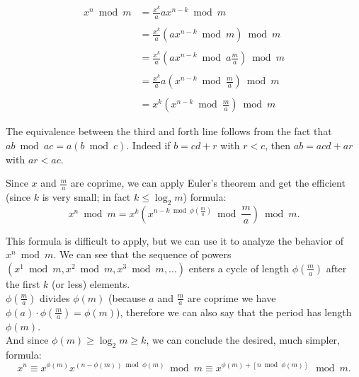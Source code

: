 $$\begin{align}x^n \bmod m &= \frac{x^k}{a}ax^{n-k}\bmod m \\\\
&= \frac{x^k}{a}\left(ax^{n-k}\bmod m\right) \bmod m \\\\
&= \frac{x^k}{a}\left(ax^{n-k}\bmod a \frac{m}{a}\right) \bmod m \\\\
&=\frac{x^k}{a} a \left(x^{n-k} \bmod \frac{m}{a}\right)\bmod m \\\\
&= x^k\left(x^{n-k} \bmod \frac{m}{a}\right)\bmod m
\end{align}$$

The equivalence between the third and forth line follows from the fact that $ab \bmod ac = a(b \bmod c)$.
Indeed if $b = cd + r$ with $r < c$, then $ab = acd + ar$ with $ar < ac$.

Since $x$ and $\frac{m}{a}$ are coprime, we can apply Euler's theorem and get the efficient (since $k$ is very small; in fact $k \le \log_2 m$) formula:
$$x^n \bmod m = x^k\left(x^{n-k \bmod \phi(\frac{m}{a})} \bmod \frac{m}{a}\right)\bmod m.$$

This formula is difficult to apply, but we can use it to analyze the behavior of $x^n \bmod m$. We can see that the sequence of powers $(x^1 \bmod m, x^2 \bmod m, x^3 \bmod m, \dots)$ enters a cycle of length $\phi\left(\frac{m}{a}\right)$ after the first $k$ (or less) elements. \\
$\phi\left(\frac{m}{a}\right)$ divides $\phi(m)$ (because $a$ and $\frac{m}{a}$ are coprime we have $\phi(a) \cdot \phi\left(\frac{m}{a}\right) = \phi(m)$), therefore we can also say that the period has length $\phi(m)$.\\
And since $\phi(m) \ge \log_2 m \ge k$, we can conclude the desired, much simpler, formula:\\
$$ x^n \equiv x^{\phi(m)} x^{(n - \phi(m)) \bmod \phi(m)} \bmod m \equiv x^{\phi(m)+[n \bmod \phi(m)]} \mod m.$$

